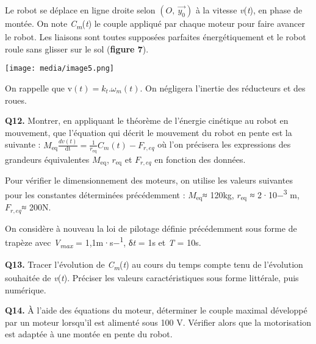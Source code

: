 \documentclass[
]{article}
\begin{document}
Le robot se déplace en ligne droite selon
\((O,\ \overrightarrow{y_{0}})\) à la vitesse \emph{v}(\emph{t}), en
phase de montée. On note \emph{C\textsubscript{m}}(\emph{t}) le couple
appliqué par chaque moteur pour faire avancer le robot. Les liaisons
sont toutes supposées parfaites énergétiquement et le robot roule sans
glisser sur le sol (\textbf{figure 7}).

\texttt{[image: media/image5.png]}

On rappelle
que\(\text{\ v}\left( t \right) = k_{t}.\omega_{m}\left( t \right)\). On
négligera l'inertie des réducteurs et des roues.

\textbf{Q12.} Montrer, en appliquant le théorème de l'énergie cinétique
au robot en mouvement, que l'équation qui décrit le mouvement du robot
en pente est la suivante :
\(M_{\text{eq}}\frac{dv(t)}{\text{dt}} = \frac{1}{r_{\text{eq}}}C_{m}\left( t \right) - F_{r,eq}\)
où l'on précisera les expressions des grandeurs équivalentes
\(M_{\text{eq}}\), \(r_{\text{eq}}\) et \(F_{r,eq}\) en fonction des
données.

Pour vérifier le dimensionnement des moteurs, on utilise les valeurs
suivantes pour les constantes déterminées précédemment :
\(M_{\text{eq}}\)≈ 120kg, \(r_{\text{eq}}\) ≈ 2·10−\textsuperscript{3}
m, \(F_{r,eq}\)≈ 200N.

On considère à nouveau la loi de pilotage définie précédemment sous
forme de trapèze avec \emph{V\textsubscript{max }}=
1,1m·s−\textsuperscript{1}, δ\emph{t} = 1s et \emph{T} = 10s.

\textbf{Q13.} Tracer l'évolution de \emph{C\textsubscript{m}}(\emph{t})
au cours du temps compte tenu de l'évolution souhaitée de
\emph{v}(\emph{t}). Préciser les valeurs caractéristiques sous forme
littérale, puis numérique.

\textbf{Q14.} À l'aide des équations du moteur, déterminer le couple
maximal développé par un moteur lorsqu'il est alimenté sous 100 V.
Vérifier alors que la motorisation est adaptée à une montée en pente du
robot.
\end{document}
